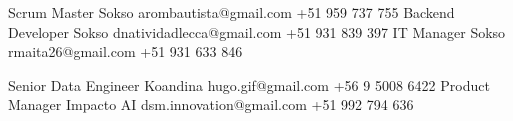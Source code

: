 %
%
%

\vspace{1em}
\begin{referees}
		 	{}
		 	{Scrum Master}
		 	{Sokso}
		 	{arombautista@gmail.com}
		 	{+51 959 737 755}
		 	{}
		 	{Backend Developer}
		 	{Sokso}
		 	{dnatividadlecca@gmail.com}
		 	{+51 931 839 397}
		 	{}
		 	{IT Manager}
		 	{Sokso}
		 	{rmaita26@gmail.com}
		 	{+51 931 633 846}
\par\bigskip
		 	{}
		 	{Senior Data Engineer}
		 	{Koandina}
		 	{hugo.gif@gmail.com}
		 	{+56 9 5008 6422}
		 	{}
		 	{Product Manager}
		 	{Impacto AI}
		 	{dsm.innovation@gmail.com}
		 	{+51 992 794 636}
\end{referees}